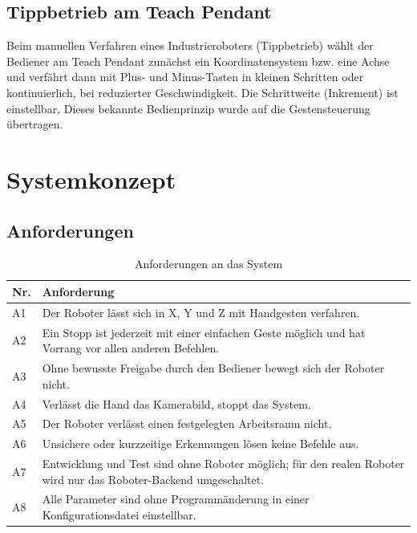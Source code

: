 \documentclass[11pt,a4paper]{article}
\begin{document}
\subsection{Tippbetrieb am Teach Pendant}

Beim manuellen Verfahren eines Industrieroboters (Tippbetrieb) wählt der Bediener am Teach Pendant
zunächst ein Koordinatensystem bzw. eine Achse und verfährt dann mit Plus- und Minus-Tasten in
kleinen Schritten oder kontinuierlich, bei reduzierter Geschwindigkeit. Die Schrittweite
(Inkrement) ist einstellbar. Dieses bekannte Bedienprinzip wurde auf die Gestensteuerung übertragen.

\section{Systemkonzept}

\subsection{Anforderungen}

\begin{table}[H]
\centering
\begin{tabularx}{\textwidth}{>{\raggedright\arraybackslash}p{0.8cm}>{\raggedright\arraybackslash}X}
\toprule
Nr. & Anforderung \\
\midrule
A1 & Der Roboter lässt sich in X, Y und Z mit Handgesten verfahren. \\
A2 & Ein Stopp ist jederzeit mit einer einfachen Geste möglich und hat Vorrang vor allen anderen Befehlen. \\
A3 & Ohne bewusste Freigabe durch den Bediener bewegt sich der Roboter nicht. \\
A4 & Verlässt die Hand das Kamerabild, stoppt das System. \\
A5 & Der Roboter verlässt einen festgelegten Arbeitsraum nicht. \\
A6 & Unsichere oder kurzzeitige Erkennungen lösen keine Befehle aus. \\
A7 & Entwicklung und Test sind ohne Roboter möglich; für den realen Roboter wird nur das Roboter-Backend umgeschaltet. \\
A8 & Alle Parameter sind ohne Programmänderung in einer Konfigurationsdatei einstellbar. \\
\bottomrule
\end{tabularx}
\caption{Anforderungen an das System}
\end{table}
\end{document}
